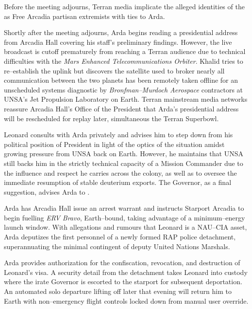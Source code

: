 Before the meeting adjourns, Terran media implicate the alleged identities of the  as Free Arcadia partisan extremists with ties to Arda.

Shortly after the meeting adjourns, Arda begins reading a presidential address from Arcadia Hall covering his staff's preliminary findings. However, the live broadcast is cutoff prematurely from reaching a Terran audience due to technical difficulties with the {\it Mars Enhanced Telecommunications Orbiter}. Khalid tries to re--establish the uplink but discovers the satellite used to broker nearly all communication between the two planets has been remotely taken offline for an unscheduled systems diagnostic by {\it Bronfman--Murdoch Aerospace} contractors at UNSA's Jet Propulsion Laboratory on Earth. Terran mainstream media networks reassure Arcadia Hall's Office of the President that Arda's presidential address will be rescheduled for replay later, simultaneous the Terran Superbowl.

Leonard consults with Arda privately and advises him to step down from his political position of President in light of the optics of the situation amidst growing pressure from UNSA back on Earth. However, he maintains that UNSA still backs him in the strictly technical capacity of a Mission Commander due to the influence and respect he carries across the colony, as well as to oversee the immediate resumption of stable deuterium exports. The Governor, as a final suggestion, advises Arda to .
\StopTimelineDate

Arda has Arcadia Hall issue an arrest warrant and instructs Starport Arcadia to begin fuelling {\it ERV Bravo}, Earth--bound, taking advantage of a minimum--energy launch window. With allegations and rumours that Leonard is a NAU--CIA asset, Arda deputizes the first personnel of a newly formed RAP police detachment, superannuating the minimal contingent of deputy United Nations Marshals. 

Arda provides authorization for the confiscation, revocation, and destruction of Leonard's visa. A security detail from the detachment takes Leonard into custody where the irate Governor is escorted to the starport for subsequent deportation. An automated solo departure lifting off later that evening will return him to Earth with non--emergency flight controls locked down from manual user override.
\StopTimelineDate


